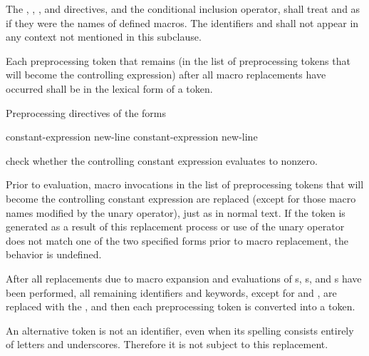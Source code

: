 \pnum
The
, , , and 
directives, and
the  conditional inclusion operator,
shall treat  and 
as if they were the names of defined macros.
The identifiers  and 
shall not appear in any context not mentioned in this subclause.

\pnum
Each preprocessing token that remains (in the list of preprocessing tokens that
will become the controlling expression)
after all macro replacements have occurred
shall be in the lexical form of a token.

\pnum
Preprocessing directives of the forms
\begin{ncsimplebnf}\obeyspaces
{}%
 constant-expression new-line \br
{}%
 constant-expression new-line 
\end{ncsimplebnf}
check whether the controlling constant expression evaluates to nonzero.

\pnum
Prior to evaluation,
macro invocations in the list of preprocessing tokens
that will become the controlling constant expression
are replaced
(except for those macro names modified by the
unary operator),
just as in normal text.
If the token
is generated as a result of this replacement process
or use of the
unary operator does not match one of the two specified forms
prior to macro replacement,
the behavior is undefined.

\pnum
After all replacements due to macro expansion and
evaluations of
s,
s, and
s
have been performed,
all remaining identifiers and keywords,
except for
and
,
are replaced with the 
,
and then each preprocessing token is converted into a token.
\begin{note}
An alternative
token is not an identifier,
even when its spelling consists entirely of letters and underscores.
Therefore it is not subject to this replacement.
\end{note}

